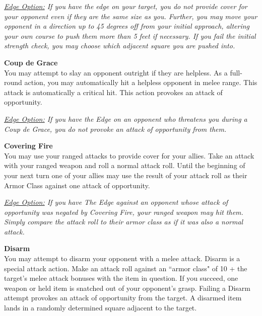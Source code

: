 \smallskip\emph{\underline{Edge Option:} If you have the edge on your target, you do not provide cover for your opponent even if they are the same size as you. Further, you may move your opponent in a direction up to 45 degrees off from your initial approach, altering your own course to push them more than 5 feet if necessary. If you fail the initial strength check, you may choose which adjacent square you are pushed into.}\\

\hypertarget{combat:coupdegrace}{}
\normalsize\item\textbf{{Coup de Grace}}\\\small
You may attempt to slay an opponent outright if they are helpless. As a full-round action, you may automatically hit a helpless opponent in melee range. This attack is automatically a critical hit. This action provokes an attack of opportunity.


\smallskip\emph{\underline{Edge Option:} If you have the Edge on an opponent who threatens you during a Coup de Grace, you do not provoke an attack of opportunity from them.}\\

\hypertarget{combat:coveringfire}{}
\normalsize\item\textbf{{Covering Fire}}\\\small
You may use your ranged attacks to provide cover for your allies. Take an attack with your ranged weapon and roll a normal attack roll. Until the beginning of your next turn one of your allies may use the result of your attack roll as their Armor Class against one attack of opportunity.

\smallskip\emph{\underline{Edge Option:} If you have The Edge against an opponent whose attack of opportunity was negated by Covering Fire, your ranged weapon may hit them. Simply compare the attack roll to their armor class as if it was also a normal attack.}\\

\hypertarget{combat:disarm}{}
\normalsize\item\textbf{{Disarm}}\\\small
You may attempt to disarm your opponent with a melee attack. Disarm is a special attack action. Make an attack roll against an ``armor class" of 10 + the target's melee attack bonuses with the item in question. If you succeed, one weapon or held item is snatched out of your opponent's grasp. Failing a Disarm attempt provokes an attack of opportunity from the target. A disarmed item lands in a randomly determined square adjacent to the target.

